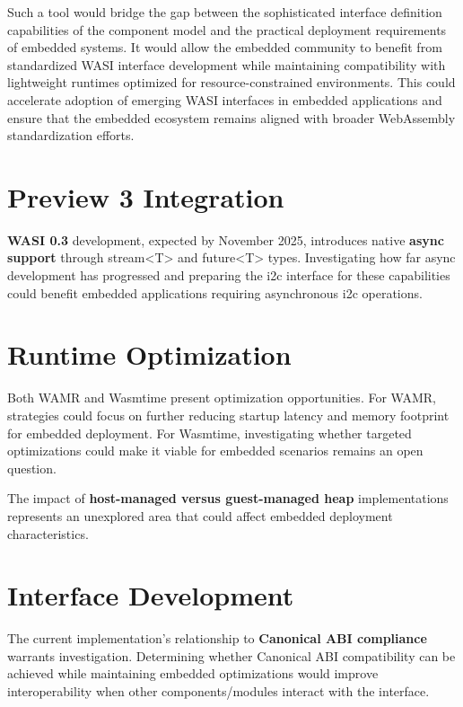 Such a tool would bridge the gap between the sophisticated interface definition capabilities of the component model and the practical deployment requirements of embedded systems. It would allow the embedded community to benefit from standardized WASI interface development while maintaining compatibility with lightweight runtimes optimized for resource-constrained environments. This could accelerate adoption of emerging WASI interfaces in embedded applications and ensure that the embedded ecosystem remains aligned with broader WebAssembly standardization efforts.

\section*{Preview 3 Integration}
\label{sec:preview3-integration}

\textbf{WASI 0.3} development, expected by November 2025, introduces native \textbf{async support} through stream<T> and future<T> types. Investigating how far async development has progressed and preparing the \acrshort{i2c} interface for these capabilities could benefit embedded applications requiring asynchronous \acrshort{i2c} operations.

\section*{Runtime Optimization}
\label{sec:runtime-optimization}

Both WAMR and Wasmtime present optimization opportunities. For WAMR, strategies could focus on further reducing startup latency and memory footprint for embedded deployment. For Wasmtime, investigating whether targeted optimizations could make it viable for embedded scenarios remains an open question.

The impact of \textbf{host-managed versus guest-managed heap} implementations represents an unexplored area that could affect embedded deployment characteristics.

\section*{Interface Development}
\label{sec:interface-development}

The current implementation's relationship to \textbf{Canonical ABI compliance} warrants investigation. Determining whether Canonical ABI compatibility can be achieved while maintaining embedded optimizations would improve interoperability when other components/modules interact with the interface.

